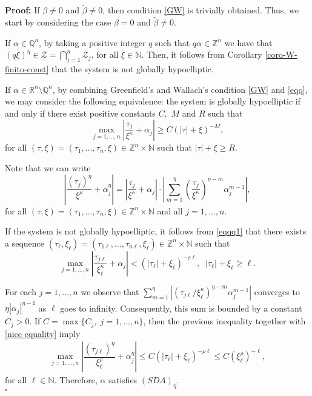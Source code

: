 \documentclass[12pt]{elsarticle}
\numberwithin{equation}{section}
\newenvironment{proof}[1][\noindent \textbf{Proof: }]{#1}{ \hfill $\square$ \vspace{2mm}}
\begin{document}
\begin{proof} 
	If $\beta\neq 0$ and $\widetilde\beta\neq0$, then  condition \eqref{GW} is trivially obtained. Thus, we start by considering the case $\beta=0 $ and $\widetilde\beta\neq0$. 
	
	If $\alpha\in\mathbb{Q}^n$, by taking a positive integer $q$ such that $q \alpha\in\mathbb{Z}^n$ we have  that $(q \xi)^\eta\in \mathcal{Z}=\bigcap_{j=1}^n \mathcal{Z}_j$, for all $\xi\in \mathbb{N}$. Then, it follows from Corollary \ref{coro-W-finito-const} that the system is not globally hypoelliptic.
	
	If $\alpha\in\mathbb{R}^n\setminus\mathbb{Q}^n$, by combining Greenfield's and Wallach's condition  \eqref{GW} and \eqref{eqq}, we may consider the following equivalence:  the system is globally hypoelliptic if and only if  there exist positive constants $C,$ $M$ and $R$ such that
	\begin{equation}\label{eqqq1}
	\max_{j=1,\ldots,n}\left|\dfrac{\tau_j}{\xi^{\kappa}}+\alpha_j\right|\geq C(|\tau|+\xi)^{-M},
	\end{equation}
	for all $(\tau,\xi)=(\tau_1,\ldots,\tau_n,\xi)\in\mathbb{Z}^n\times\mathbb{N}$ such that $|\tau|+\xi\geq R.$
	
	
	Note that we can write 
	\begin{equation}\label{nice equality}
	\left|\dfrac{(\tau_j)^\eta}{\xi^{\rho}}+\alpha_j^\eta\right|= \left|\dfrac{\tau_j}{\xi^{\kappa}}+\alpha_j\right|\cdot \left|\sum_{m=1}^{\eta}\left(\dfrac{\tau_j}{\xi^{\kappa}}\right)^{\eta-m}\alpha_j^{m-1}\right|,
	\end{equation}
	for all $(\tau,\xi)=(\tau_1,\ldots,\tau_n,\xi)\in\mathbb{Z}^n\times \mathbb{N}$ and all $j=1,\ldots,n$.
	
	
	If the system is not globally hypoelliptic,
	it follows from \eqref{eqqq1} that there exists a sequence $(\tau_{\ell},\xi_{\ell})=(\tau_{1\ell},\ldots,\tau_{n\ell},\xi_{\ell})\in\mathbb{Z}^n\times\mathbb{N}$ such that
	\begin{equation*}
	\max_{j=1,\ldots,n}\left|\dfrac{\tau_{j\ell}}{\xi_{\ell}^{\kappa}}+\alpha_j\right|<(|\tau_{\ell}|+\xi_{\ell})^{-\rho\ell},\;\; |\tau_\ell|+\xi_\ell\geq \ell.
	\end{equation*}
	
	For each $j=1,\ldots,n$ we observe that  $\sum_{m=1}^{\eta}\left|({\tau_{j\ell}}/{\xi_{\ell}^{\kappa}})^{\eta-m}\alpha_j^{m-1}\right|$ converges to $\eta|\alpha_j|^{\eta-1}$ as $\ell$ goes to infinity. Consequently,  this sum is bounded by a constant  $C_j>0$. If $C=\max\{C_j,\;j=1,\ldots,n\}$, then the previous inequality together with \eqref{nice equality} imply    
	\begin{eqnarray*}
		\max_{j=1,\ldots,n}\left|\dfrac{(\tau_{j\ell})^{\eta}}{\xi_{\ell}^{\rho}}+\alpha_j^\eta\right|
		\leq C (|\tau_{\ell}|+\xi_{\ell})^{-\rho\ell}\leq C (\xi_{\ell}^{\rho})^{-\ell} ,
	\end{eqnarray*}
	for all $\ell\in \mathbb{N}$. Therefore,  $\alpha$ satisfies  $(SDA)_\eta$.\\
	

\end{proof}
\end{document}
